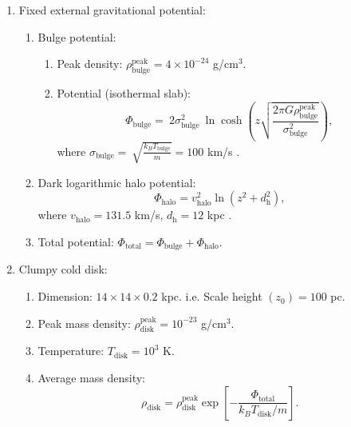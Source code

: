 \documentclass[twocolumn]{aastex631}
\begin{document}
\begin{enumerate}
\item Fixed external gravitational potential:
  \begin{enumerate}
    \item Bulge potential:
      \begin{enumerate}
       \item Peak density: $\rho_{\text{bulge}}^{\text{peak}}=4\times 10^{-24}$ g/cm$^3$.
       \item Potential (isothermal slab):
         \begin{equation}
           \Phi_{\text{bulge}}=\
           2\sigma^2_{\text{bulge}}\
           \ln\cosh\left(z\sqrt{\frac{2\pi G\rho_{\text{bulge}}^{\text{peak}}}{\sigma^2_{\text{bulge}}}}\right),
         \end{equation}
          where $\displaystyle \sigma_{\text{bulge}}=\
                \sqrt{\frac{k_{B}T_{\text{bulge}}}{m}}=100$ km/s \citep{velocity-dispersion-MW}.
      \end{enumerate}

    \item Dark logarithmic halo potential:
         \begin{equation}
           \Phi_{\text{halo}}=v^2_{\text{halo}}\ln\left(z^2+d^2_{\text{h}}\right),
         \end{equation}
         where $v_{\text{halo}}=131.5$ km/s, $d_{\text{h}}=12$ kpc \citep{Yang2013}.

    \item Total potential: $\Phi_{\text{total}}=\Phi_{\text{bulge}}+\Phi_{\text{halo}}$.
  \end{enumerate}


\item Clumpy cold disk:
  \begin{enumerate}
    \item Dimension: $14\times14\times0.2$ kpc. i.e. Scale height $(z_{0})=100$ pc. \citep{paek-ism-density}
    \item Peak mass density: $\rho_{\text{disk}}^{\text{peak}}=10^{-23}$ g/cm$^3$. \citep{paek-ism-density}
    \item Temperature: $T_{\text{disk}}=10^{3}$ K. \citep{paek-ism-density}
    \item Average mass density:
          \begin{equation}
             \rho_{\text{disk}}=\rho_{\text{disk}}^{\text{peak}}
             \exp\left[-\frac{\Phi_{\text{total}}}{k_{B}T_{\text{disk}}/m}\right].
             \label{disk-density}
          \end{equation}


\end{enumerate}
\end{enumerate}
\end{document}
